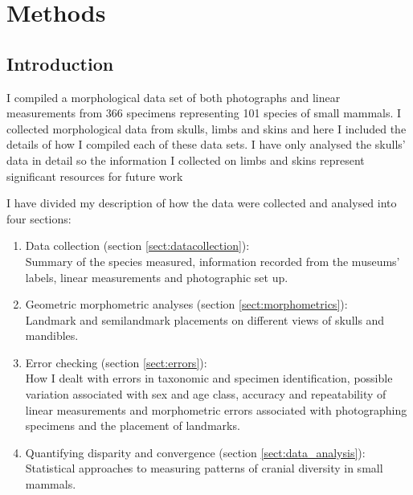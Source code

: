 
\chapter{Methods}
\label{chap:methods}

\section{Introduction}

	I compiled a morphological data set of both photographs and linear measurements from 366 specimens representing 101 species of small mammals. %
	I collected morphological data from skulls, limbs and skins and here I included the details of how I compiled each of these data sets. I have only analysed the skulls' data in detail so the information I collected on limbs and skins represent significant resources for future work %
	
	I have divided my description of how the data were collected and analysed into four sections:
	
	\begin{enumerate}[i]
	
	\item Data collection (section \ref{sect:datacollection}): \\
	Summary of the species measured, information recorded from the museums' labels, linear measurements and photographic set up.
	
	\item Geometric morphometric analyses (section \ref{sect:morphometrics}):\\
	Landmark and semilandmark placements on different views of skulls and mandibles.
	
	\item Error checking (section \ref{sect:errors}): \\
	How I dealt with errors in taxonomic and specimen identification, possible variation associated with sex and age class, accuracy and repeatability of linear measurements and morphometric errors associated with photographing specimens and the placement of landmarks.
	
	
	\item Quantifying disparity and convergence (section \ref{sect:data_analysis}):\\
	Statistical approaches to measuring patterns of cranial diversity in small mammals.
	
	\end{enumerate} 


